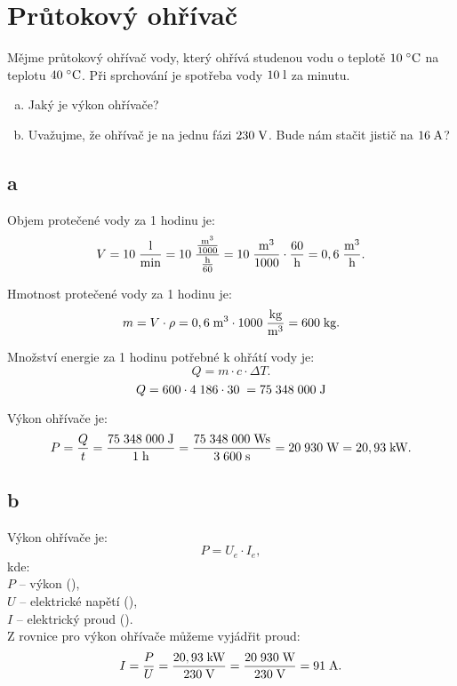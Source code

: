 \documentclass{article}
\begin{document}
\newpage



\section{ Průtokový ohřívač \spicy}
Mějme průtokový ohřívač vody, který ohřívá studenou vodu o teplotě $10 \; ^\circ \textrm{C}$ \fs na teplotu $40 \; ^\circ \textrm{C}$. Při sprchování je spotřeba vody $10 \; \textrm{l}$ za minutu.

\begin{enumerate}[a)]
    \item Jaký je výkon ohřívače?
    \item Uvažujme, že ohřívač je na jednu fázi $230 \; \textrm{V}$. Bude nám stačit jistič na $16 \; \textrm{A}$?
\end{enumerate}



\subsection{a}
Objem protečené vody za 1 hodinu je:
$$
    V = 10 \; \frac{\textrm{l}}{\textrm{min}} = 10 \; \frac{\frac{\textrm{m}^{\textrm{3}}}{1000}}{\frac{\textrm{h}}{60}} = 10 \; \frac{\textrm{m}^{\textrm{3}}}{1000} \cdot \frac{60}{\textrm{h}} = 0,6 \; \frac{\textrm{m}^{\textrm{3}}}{\textrm{h}}.
$$

Hmotnost protečené vody za 1 hodinu je:
$$
    m = V \cdot \rho = 0,6 \; \textrm{m}^{\textrm{3}} \cdot 1 000 \; \frac{\textrm{kg}}{\textrm{m}^{\textrm{3}}} = 600 \; \textrm{kg}.
$$

Množství energie za 1 hodinu potřebné k ohřátí vody je:
$$
    Q = m \cdot c \cdot \Delta T.
$$
$$
    Q = 600 \cdot 4 \; 186 \cdot 30 \; = 75 \; 348 \; 000 \; \textrm{J}
$$

Výkon ohřívače je:
$$
    P = \frac{Q}{t} = \frac{75 \; 348 \; 000 \; \textrm{J}}{1 \; \textrm{h}} = \frac{75 \; 348 \; 000 \; \textrm{Ws}}{3 \; 600 \; \textrm{s}} = 20 \; 930 \; \textrm{W} = 20,93 \; \textrm{kW}.
$$



\subsection{b}
Výkon ohřívače je:
$$
    P = U_e \cdot I_e,
$$
kde:\\
$P$ -- výkon (\ueqW),\\
$U$ -- elektrické napětí (\ueqV),\\
$I$ -- elektrický proud (\ueqA).\\

Z rovnice pro výkon ohřívače můžeme vyjádřit proud:
$$
    I = \frac{P}{U} = \frac{20,93 \; \textrm{kW}}{230 \; \textrm{V}} = \frac{20 \; 930 \; \textrm{W}}{230 \; \textrm{V}} = 91 \; \textrm{A}.
$$
\end{document}

